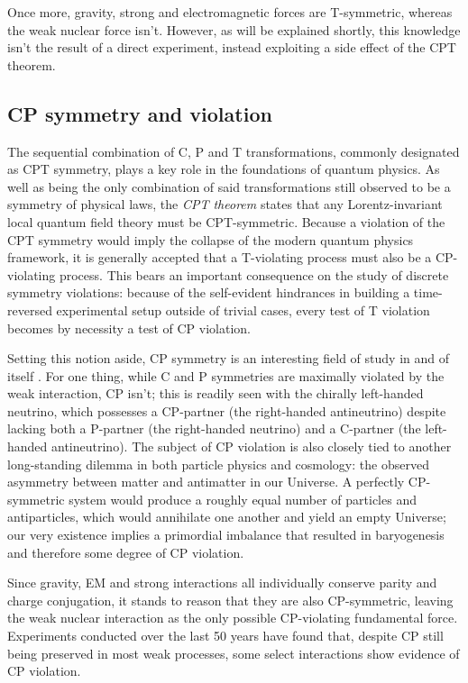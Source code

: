 Once more, gravity, strong and electromagnetic forces are T-symmetric, whereas the weak nuclear force isn't.
However, as will be explained shortly, this knowledge isn't the result of a direct experiment, instead exploiting a side effect of the CPT theorem.

\subsection{CP symmetry and violation}
\label{sec:CP-symmetry-violation}
The sequential combination of C, P and T transformations, commonly designated as CPT symmetry, plays a key role in the foundations of quantum physics.
As well as being the only combination of said transformations still observed to be a symmetry of physical laws, the \textit{CPT theorem} states that any Lorentz-invariant local quantum field theory must be CPT-symmetric.
Because a violation of the CPT symmetry would imply the collapse of the modern quantum physics framework, it is generally accepted that a T-violating process must also be a CP-violating process.
This bears an important consequence on the study of discrete symmetry violations: because of the self-evident hindrances in building a time-reversed experimental setup outside of trivial cases, every test of T violation becomes by necessity a test of CP violation.

Setting this notion aside, CP symmetry is an interesting field of study in and of itself \cite{cpvws}.
For one thing, while C and P symmetries are maximally violated by the weak interaction, CP isn't;
this is readily seen with the chirally left-handed neutrino, which possesses a CP-partner (the right-handed antineutrino) despite lacking both a P-partner (the right-handed neutrino) and a C-partner (the left-handed antineutrino).
The subject of CP violation is also closely tied to another long-standing dilemma in both particle physics and cosmology: the observed asymmetry between matter and antimatter in our Universe.
A perfectly CP-symmetric system would produce a roughly equal number of particles and antiparticles, which would annihilate one another and yield an empty Universe;
our very existence implies a primordial imbalance that resulted in baryogenesis and therefore some degree of CP violation.

Since gravity, EM and strong interactions all individually conserve parity and charge conjugation, it stands to reason that they are also CP-symmetric, leaving the weak nuclear interaction as the only possible CP-violating fundamental force.
Experiments conducted over the last 50 years have found that, despite CP still being preserved in most weak processes, some select interactions show evidence of CP violation.

